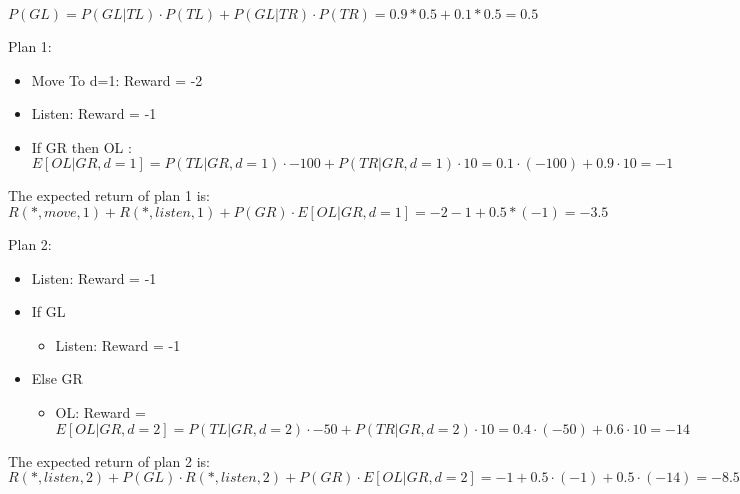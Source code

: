 \documentclass{article}
\begin{document}
    $P(GL) = P(GL|TL) \cdot P(TL) + P(GL|TR) \cdot P(TR) = 0.9*0.5 + 0.1*0.5 = 0.5$
    
    Plan 1:
    \begin{itemize}
        \item Move To d=1: Reward = -2
        \item Listen: Reward = -1
        \item If GR then OL : 
        \[
        E[OL|GR,d=1] = P(TL|GR,d=1) \cdot -100 + P(TR|GR,d=1) \cdot 10 = 0.1 \cdot (-100) + 0.9 \cdot 10 = -1
        \]
    \end{itemize}
    The expected return of plan 1 is:\[R(*,move,1) + R(*,listen,1)+ P(GR)\cdot E[OL|GR,d=1] = -2 -1 +0.5*(-1) = -3.5 \]

    Plan 2:
    \begin{itemize}
        \item Listen: Reward = -1
        \item If GL
        \begin{itemize}
            \item Listen: Reward = -1
        \end{itemize}
        \item Else GR 
        \begin{itemize}
            \item OL: Reward = $E[OL|GR,d=2] = P(TL|GR,d=2) \cdot -50 + P(TR|GR,d=2) \cdot 10 = 0.4 \cdot (-50) + 0.6 \cdot 10 = -14$ 
        \end{itemize}
    \end{itemize}

    The expected return of plan 2 is:\[R(*,listen,2)+ P(GL)\cdot R(*,listen,2) + P(GR)\cdot E[OL|GR,d=2] = -1 + 0.5\cdot (-1) + 0.5\cdot(-14) = -8.5 \]
\end{document}
